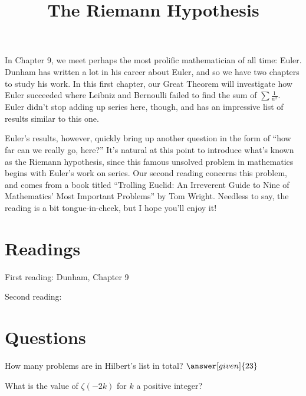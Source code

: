 \documentclass[nooutcomes]{ximera}
\title{The Riemann Hypothesis}
\begin{document}
\begin{abstract}
    
\end{abstract}
\maketitle

In Chapter 9, we meet perhaps the most prolific mathematician of all time: Euler.  Dunham has written a lot in his career about Euler, and so we have two chapters to study his work.  In this first chapter, our Great Theorem will investigate how Euler succeeded where Leibniz and Bernoulli failed to find the sum of $\sum \frac{1}{n^2}$.  Euler didn't stop adding up series here, though, and has an impressive list of results similar to this one.

Euler's results, however, quickly bring up another question in the form of ``how far can we really go, here?''  It's natural at this point to introduce what's known as the Riemann hypothesis, since this famous unsolved problem in mathematics begins with Euler's work on series.  Our second reading concerns this problem, and comes from a book titled ``Trolling Euclid: An Irreverent Guide to Nine of Mathematics' Most Important Problems'' by Tom Wright. Needless to say, the reading is a bit tongue-in-cheek, but I hope you'll enjoy it!


\section{Readings}
First reading: Dunham, Chapter 9

Second reading: 



\section{Questions}

\begin{question}
How many problems are in Hilbert's list in total? $\answer[given]{23}$
\end{question}

\begin{question}
What is the value of $\zeta(-2k)$ for $k$ a positive integer?
\begin{multipleChoice}
\end{multipleChoice}
\end{question}


%
\end{document}
